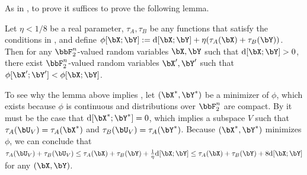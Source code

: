 \documentclass{article}
\DeclarePairedDelimiter{\sqpar}{[}{]}
\newcommand{\Ruz}{\mathrm{d}\sqpar}
\newcommand{\pot}{\phi\sqpar}
\begin{document}
As in \cite{GGMT23}, to prove  it suffices to prove the following lemma. 
\begin{lemma}\label{lemma:decrease}
Let $\eta<1/8$ be a real parameter, $\tau_A,\tau_B$ be any functions that satisfy the conditions in , and define $\pot{\bX;\bY}:=\Ruz{\bX;\bY}+\eta(\tau_A(\bX)+\tau_B(\bY))$. Then for any $\bbF_2^n$-valued random variables $\bX,\bY$ such that $\Ruz{\bX;\bY}>0$, there exist $\bbF_2^n$-valued random variables $\bX',\bY'$ such that
$\pot{\bX';\bY'}<\pot{\bX;\bY}$.
\end{lemma}
\noindent
To see why the lemma above implies , let $(\bX^*,\bY^*)$ be a minimizer of $\phi$, which exists because $\phi$ is continuous and distributions over $\bbF_2^n$ are compact. By  it must be the case that $\Ruz{\bX^*;\bY^*}=0$, which implies a subspace $V$ such that $\tau_A(\bU_V)=\tau_A(\bX^*)$ and $\tau_B(\bU_V)=\tau_A(\bY^*)$. Because $(\bX^*,\bY^*)$ minimizes $\phi$, we can conclude that $\tau_A(\bU_V)+\tau_B(\bU_V)\le \tau_A(\bX)+\tau_B(\bY)+\frac{1}{\eta}\Ruz{\bX;\bY}\le \tau_A(\bX)+\tau_B(\bY)+8\Ruz{\bX;\bY}$ for any $(\bX,\bY)$.
\end{document}
